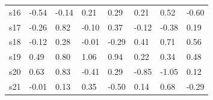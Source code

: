 \begin{table}[]
\begin{tabular}{llllllll}
s16 & -0.54                                                         & -0.14                                                        & \cellcolor[HTML]{C0C0C0}0.21                                            & \cellcolor[HTML]{C0C0C0}0.29 & \cellcolor[HTML]{C0C0C0}0.21                                     & \cellcolor[HTML]{C0C0C0}0.52                                         & -0.60                                                                      \\
s17 & -0.26                                                         & \cellcolor[HTML]{9B9B9B}0.82                                 & -0.10                                                                   & \cellcolor[HTML]{C0C0C0}0.37 & -0.12                                                            & -0.38                                                                & \cellcolor[HTML]{C0C0C0}0.19                                               \\
s18 & -0.12                                                         & \cellcolor[HTML]{C0C0C0}0.28                                 & -0.01                                                                   & -0.29                        & \cellcolor[HTML]{C0C0C0}0.41                                     & \cellcolor[HTML]{9B9B9B}0.71                                         & \cellcolor[HTML]{C0C0C0}0.56                                               \\
s19 & \cellcolor[HTML]{C0C0C0}0.49                                  & \cellcolor[HTML]{9B9B9B}0.80                                 & \cellcolor[HTML]{9B9B9B}1.06                                            & \cellcolor[HTML]{9B9B9B}0.94 & \cellcolor[HTML]{C0C0C0}0.22                                     & \cellcolor[HTML]{C0C0C0}0.34                                         & \cellcolor[HTML]{C0C0C0}0.48                                               \\
s20 & \cellcolor[HTML]{9B9B9B}0.63                                  & \cellcolor[HTML]{9B9B9B}0.83                                 & -0.41                                                                   & \cellcolor[HTML]{C0C0C0}0.29 & -0.85                                                            & -1.05                                                                & \cellcolor[HTML]{C0C0C0}0.12                                               \\
s21 & -0.01                                                         & \cellcolor[HTML]{C0C0C0}0.13                                 & \cellcolor[HTML]{C0C0C0}0.35                                            & -0.50                        & \cellcolor[HTML]{C0C0C0}0.14                                     & \cellcolor[HTML]{9B9B9B}0.68                                         & -0.29                                                                      \\

\end{tabular}
\end{table}
